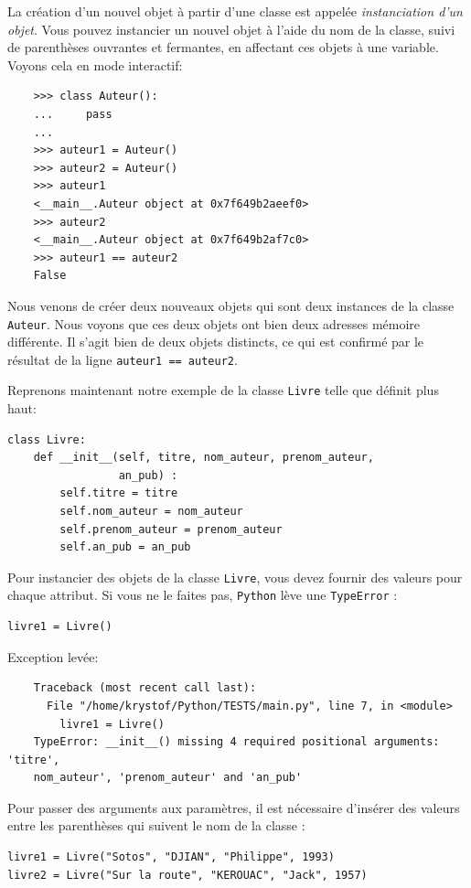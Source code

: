 \documentclass[a4paper,12pt]{book}
\begin{document}
La création d'un nouvel objet à partir d'une classe est appelée \textit{instanciation d'un objet}. Vous pouvez instancier un nouvel objet à l'aide du nom de la classe, suivi de parenthèses ouvrantes et fermantes, en affectant ces objets à une variable. Voyons cela en mode interactif:
\begin{verbatim}
    >>> class Auteur():
    ...     pass
    ... 
    >>> auteur1 = Auteur()
    >>> auteur2 = Auteur()
    >>> auteur1
    <__main__.Auteur object at 0x7f649b2aeef0>
    >>> auteur2
    <__main__.Auteur object at 0x7f649b2af7c0>
    >>> auteur1 == auteur2
    False
\end{verbatim}
\medskip


Nous venons de créer deux nouveaux objets qui sont deux instances de la classe \texttt{Auteur}. Nous voyons que ces deux objets ont bien deux adresses mémoire différente. Il s'agit bien de deux objets distincts, ce qui est confirmé par le résultat de la ligne \texttt{auteur1 == auteur2}.
\medskip

Reprenons maintenant notre exemple de la classe \texttt{Livre} telle que définit plus haut:
\begin{lstlisting}[caption=La classe \texttt{Livre}]
class Livre:
    def __init__(self, titre, nom_auteur, prenom_auteur, 
                 an_pub) :
		self.titre = titre
		self.nom_auteur = nom_auteur
		self.prenom_auteur = prenom_auteur
		self.an_pub = an_pub
\end{lstlisting}
\medskip

Pour instancier des objets de la classe \texttt{Livre}, vous devez fournir des valeurs pour chaque attribut. Si vous ne le faites pas, \texttt{Python} lève une \texttt{TypeError} :
\begin{lstlisting}[caption=Instanciation sans valeur]
livre1 = Livre()
\end{lstlisting}
\medskip

Exception levée:
\begin{verbatim}
    Traceback (most recent call last):
      File "/home/krystof/Python/TESTS/main.py", line 7, in <module>
        livre1 = Livre()
    TypeError: __init__() missing 4 required positional arguments: 'titre', 
    nom_auteur', 'prenom_auteur' and 'an_pub'
\end{verbatim}
\medskip

Pour passer des arguments aux paramètres, il est nécessaire d'insérer des valeurs entre les parenthèses qui suivent le nom de la classe :
\begin{lstlisting}[caption=Instanciation avec valeurs]
livre1 = Livre("Sotos", "DJIAN", "Philippe", 1993)
livre2 = Livre("Sur la route", "KEROUAC", "Jack", 1957)
\end{lstlisting}
\medskip
\end{document}
